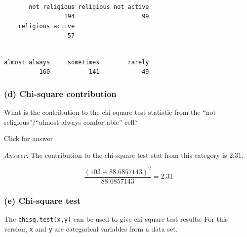 \documentclass[
]{book}
\newenvironment{Shaded}{\begin{snugshade}}{\end{snugshade}}
\newcommand{\FunctionTok}[1]{\textcolor[rgb]{0.00,0.00,0.00}{#1}}
\newcommand{\NormalTok}[1]{#1}
\newcommand{\OtherTok}[1]{\textcolor[rgb]{0.56,0.35,0.01}{#1}}
\newcommand{\SpecialCharTok}[1]{\textcolor[rgb]{0.00,0.00,0.00}{#1}}
\begin{document}
\begin{verbatim}

       not religious religious not active 
                 194                   99 
    religious active 
                  57 
\end{verbatim}

\begin{Shaded}
\end{Shaded}

\begin{verbatim}

almost always     sometimes        rarely 
          160           141            49 
\end{verbatim}

\hypertarget{d-chi-square-contribution}{%
\subsubsection{(d) Chi-square contribution}\label{d-chi-square-contribution}}

What is the contribution to the chi-square test statistic from the ``not religious''/``almost always comfortable'' cell?

Click for answer

\emph{Answer:} The contribution to the chi-square test stat from this category is 2.31.

\[
\dfrac{(103 - 88.6857143)^2}{88.6857143} = 2.31
\]

\hypertarget{e-chi-square-test}{%
\subsubsection{(e) Chi-square test}\label{e-chi-square-test}}

The \texttt{chisq.test(x,y)} can be used to give chi-square test results. For this version, \texttt{x} and \texttt{y} are categorical variables from a data set.

\begin{Shaded}
\end{Shaded}
\end{document}
